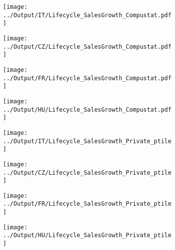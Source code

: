 \documentclass[12pt,notitlepage]{article}
\begin{document}
\begin{figure}[!htpb]
\centering
\caption{Employment (Average)}
\begin{subfigure}{.49\textwidth}
    \centering
 \texttt{[image: ../Output/IT/Lifecycle\_SalesGrowth\_Compustat.pdf]}
\end{subfigure}%
\begin{subfigure}{.49\textwidth}
    \centering
 \texttt{[image: ../Output/CZ/Lifecycle\_SalesGrowth\_Compustat.pdf]}
\end{subfigure}
\begin{subfigure}{.49\textwidth}
    \centering
 \texttt{[image: ../Output/FR/Lifecycle\_SalesGrowth\_Compustat.pdf]}
\end{subfigure}%
\begin{subfigure}{.49\textwidth}
    \centering
 \texttt{[image: ../Output/HU/Lifecycle\_SalesGrowth\_Compustat.pdf]}
\end{subfigure}
\end{figure}
\pagebreak

\begin{figure}[!htpb]
\centering
\caption{Sales Growth (Percentile - Private)}
\begin{subfigure}{.49\textwidth}
    \centering
 \texttt{[image: ../Output/IT/Lifecycle\_SalesGrowth\_Private\_ptile]}
\end{subfigure}%
\begin{subfigure}{.49\textwidth}
    \centering
 \texttt{[image: ../Output/CZ/Lifecycle\_SalesGrowth\_Private\_ptile]}
\end{subfigure}
\begin{subfigure}{.49\textwidth}
    \centering
 \texttt{[image: ../Output/FR/Lifecycle\_SalesGrowth\_Private\_ptile]}
\end{subfigure}%
\begin{subfigure}{.49\textwidth}
    \centering
 \texttt{[image: ../Output/HU/Lifecycle\_SalesGrowth\_Private\_ptile]}
\end{subfigure}
\end{figure}
\pagebreak
\end{document}
